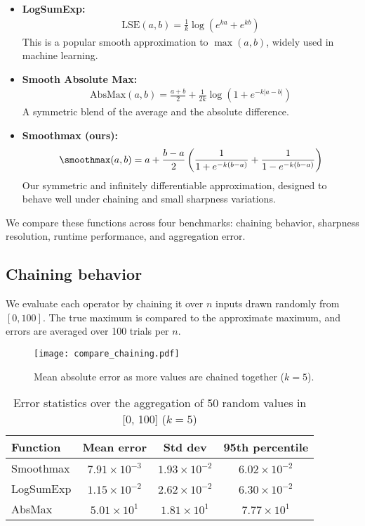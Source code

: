 \begin{itemize}
    \item \textbf{LogSumExp:}
    \begin{align}
        \mathrm{LSE}(a, b) = \frac{1}{k} \log\left(e^{k a} + e^{k b}\right)
    \end{align}
    This is a popular smooth approximation to $\max(a, b)$, widely used in machine learning.

    \item \textbf{Smooth Absolute Max:}
    \begin{align}
        \mathrm{AbsMax}(a, b) = \frac{a + b}{2} + \frac{1}{2k} \log\left(1 + e^{-k|a - b|}\right)
    \end{align}
    A symmetric blend of the average and the absolute difference.

    \item \textbf{Smoothmax (ours):}
    \begin{align}
        \smoothmax(a, b) = a + \frac{b - a}{2} \left( \frac{1}{1 + e^{-k(b - a)}} + \frac{1}{1 - e^{-k(b - a)}} \right)
    \end{align}
    Our symmetric and infinitely differentiable approximation, designed to behave well under chaining and small sharpness variations.
\end{itemize}

We compare these functions across four benchmarks: chaining behavior, sharpness resolution, runtime performance, and aggregation error.

\subsection*{Chaining behavior}

We evaluate each operator by chaining it over $n$ inputs drawn randomly from $[0, 100]$. The true maximum is compared to the approximate maximum, and errors are averaged over 100 trials per $n$.

\begin{figure}[H]
    \centering
    \texttt{[image: compare\_chaining.pdf]}
    \caption{Mean absolute error as more values are chained together ($k = 5$).}
\end{figure}

\begin{table}[H]
\centering
\begin{tabular}{l|ccc}
    \toprule
    Function & Mean error & Std dev & 95th percentile \\
    \midrule
    Smoothmax & $7.91 \times 10^{-3}$ & $1.93 \times 10^{-2}$ & $6.02 \times 10^{-2}$ \\
    LogSumExp & $1.15 \times 10^{-2}$ & $2.62 \times 10^{-2}$ & $6.30 \times 10^{-2}$ \\
    AbsMax    & $5.01 \times 10^{1}$  & $1.81 \times 10^{1}$  & $7.77 \times 10^{1}$ \\
    \bottomrule
\end{tabular}
\caption{Error statistics over the aggregation of 50 random values in [0, 100] ($k = 5$)}
\end{table}

